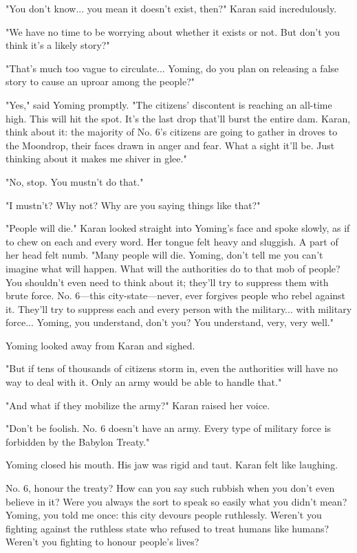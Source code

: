 "You don't know... you mean it doesn't exist, then?" Karan said
incredulously.

"We have no time to be worrying about whether it exists or not. But
don't you think it's a likely story?"

"That's much too vague to circulate... Yoming, do you plan on releasing
a false story to cause an uproar among the people?"

"Yes," said Yoming promptly. "The citizens' discontent is reaching an
all-time high. This will hit the spot. It's the last drop that'll burst
the entire dam. Karan, think about it: the majority of No. 6's citizens
are going to gather in droves to the Moondrop, their faces drawn in
anger and fear. What a sight it'll be. Just thinking about it makes me
shiver in glee."

"No, stop. You mustn't do that."

"I mustn't? Why not? Why are you saying things like that?"

"People will die." Karan looked straight into Yoming's face and spoke
slowly, as if to chew on each and every word. Her tongue felt heavy and
sluggish. A part of her head felt numb. "Many people will die. Yoming,
don't tell me you can't imagine what will happen. What will the
authorities do to that mob of people? You shouldn't even need to think
about it; they'll try to suppress them with brute force. No. 6---this
city-state---never, ever forgives people who rebel against it. They'll try
to suppress each and every person with the military... with military
force... Yoming, you understand, don't you? You understand, very, very
well."

Yoming looked away from Karan and sighed.

"But if tens of thousands of citizens storm in, even the authorities
will have no way to deal with it. Only an army would be able to handle
that."

"And what if they mobilize the army?" Karan raised her voice.

"Don't be foolish. No. 6 doesn't have an army. Every type of military
force is forbidden by the Babylon Treaty."

Yoming closed his mouth. His jaw was rigid and taut. Karan felt like
laughing.

No. 6, honour the treaty? How can you say such rubbish when you don't
even believe in it? Were you always the sort to speak so easily what you
didn't mean? Yoming, you told me once: this city devours people
ruthlessly. Weren't you fighting against the ruthless state who refused
to treat humans like humans? Weren't you fighting to honour people's
lives?

